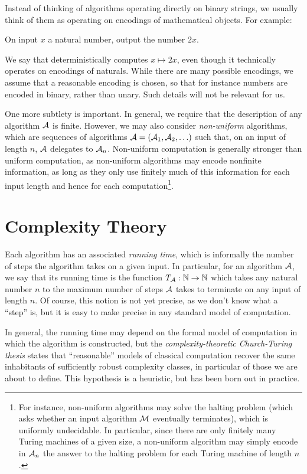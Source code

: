 Instead of thinking of algorithms operating directly on binary strings, we
usually think of them as operating on encodings of mathematical objects. For
example:

\begin{_algo}\label{alg:double}
  On input $x$ a natural number, output the number $2x$.
\end{_algo}

We say that  deterministically computes $x\mapsto
2x$, even though it technically operates on encodings of naturals. While there
are many possible encodings, we assume that a reasonable encoding is chosen, so
that for instance numbers are encoded in binary, rather than unary. Such details
will not be relevant for us.

One more subtlety is important. In general, we require that the description of
any algorithm $\mathcal{A}$ is finite. However, we may also consider \emph{non-uniform}
algorithms, which are sequences of algorithms $\mathcal{A} = (\mathcal{A}_1, \mathcal{A}_2, \ldots)$
such that, on an input of length $n$, $\mathcal{A}$ delegates to $\mathcal{A}_n$. Non-uniform
computation is generally stronger than uniform computation, as non-uniform
algorithms may encode nonfinite information, as long as they only use finitely
much of this information for each input length and hence for each
computation\footnote{
  For instance, non-uniform algorithms may solve the halting problem (which asks
  whether an input algorithm $\mathcal{M}$ eventually terminates), which is uniformly
  undecidable. In particular, since there are only finitely many Turing machines
  of a given size, a non-uniform algorithm may simply encode in $\mathcal{A}_n$ the
  answer to the halting problem for each Turing machine of length $n$.
}.

\section{Complexity Theory}

Each algorithm has an associated \emph{running time}, which is informally the
number of steps the algorithm takes on a given input. In particular, for an
algorithm $\mathcal{A}$, we say that its running time is the function $T_{\mathcal{A}}: \mathbb{N}\to\mathbb{N}$
which takes any natural number $n$ to the maximum number of steps $\mathcal{A}$ takes to
terminate on any input of length $n$. Of course, this notion is not yet precise,
as we don't know what a ``step'' is, but it is easy to make precise in any
standard model of computation.

In general, the running time may depend on the formal model of computation in
which the algorithm is constructed, but the \emph{complexity-theoretic
Church-Turing thesis} states that ``reasonable'' models of classical computation
recover the same inhabitants of sufficiently robust complexity classes, in
particular of those we are about to define. This hypothesis is a heuristic, but
has been born out in practice.


